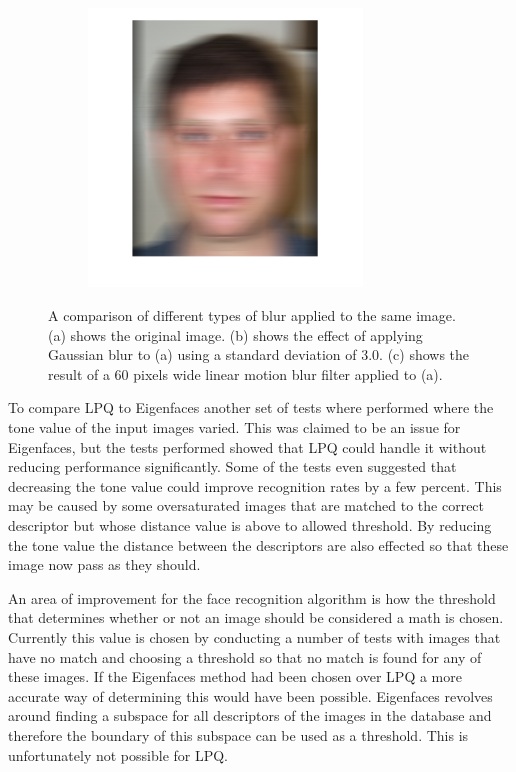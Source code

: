 \begin{figure}[H]
\begin{subfigure}{.30\textwidth}
  \includegraphics[width=0.8\textwidth]{img/blur_test/motion_img.png}
  \caption{}
\end{subfigure}%
\caption{A comparison of different types of blur applied to the same image. (a) shows the original image. (b) shows the effect of applying Gaussian blur to (a) using a standard deviation of 3.0. (c) shows the result of a 60 pixels wide linear motion blur filter applied to (a).}
\label{fig:fr_result_images}
\end{figure}

To compare LPQ to Eigenfaces another set of tests where performed where the tone value of the input images varied. This was claimed to be an issue for Eigenfaces, but the tests performed showed that LPQ could handle it without reducing performance significantly. Some of the tests even suggested that decreasing the tone value could improve recognition rates by a few percent. This may be caused by some oversaturated images that are matched to the correct descriptor but whose distance value is above to allowed threshold. By reducing the tone value the distance between the descriptors are also effected so that these image now pass as they should.

An area of improvement for the face recognition algorithm is how the threshold that determines whether or not an image should be considered a math is chosen. Currently this value is chosen by conducting a number of tests with images that have no match and choosing a threshold so that no match is found for any of these images. If the Eigenfaces method had been chosen over LPQ a more accurate way of determining this would have been possible. Eigenfaces revolves around finding a subspace for all descriptors of the images in the database and therefore the boundary of this subspace can be used as a threshold. This is unfortunately not possible for LPQ.
